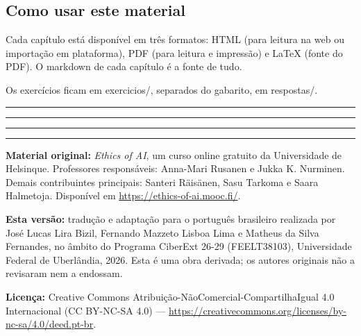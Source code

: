 \documentclass[
  11pt,
]{article}
\newcommand{\faixaEixos}[1][\linewidth]{%
  \noindent
  \textcolor{iaConceitos}{\rule{0.3333#1}{4pt}}%
  \textcolor{iaAplic}{\rule{0.3333#1}{4pt}}%
  \textcolor{iaRiscos}{\rule{0.3333#1}{4pt}}%
  \par}
\renewcommand{\texttt}[1]{{\color{iaAmeixa}\small\ttfamily #1}}
\newenvironment{licenca}
  {\par\vspace{2em}\faixaEixos\par\vspace{0.8em}
   \begingroup\sffamily\scriptsize\color{iaTintaFraca}}
  {\endgroup\par}
\begin{document}
\hypertarget{como-usar-este-material}{%
\subsection{Como usar este material}\label{como-usar-este-material}}

Cada capítulo está disponível em três formatos: HTML (para leitura na
web ou importação em plataforma), PDF (para leitura e impressão) e LaTeX
(fonte do PDF). O markdown de cada capítulo é a fonte de tudo.

Os exercícios ficam em \texttt{exercicios/}, separados do gabarito, em
\texttt{respostas/}.

\begin{center}\rule{0.5\linewidth}{0.5pt}\end{center}

\begin{licenca}

\textbf{Material original:} \emph{Ethics of AI}, um curso online
gratuito da Universidade de Helsinque. Professores responsáveis:
Anna-Mari Rusanen e Jukka K. Nurminen. Demais contribuintes principais:
Santeri Räisänen, Sasu Tarkoma e Saara Halmetoja. Disponível em
\url{https://ethics-of-ai.mooc.fi/}.

\textbf{Esta versão:} tradução e adaptação para o português brasileiro
realizada por José Lucas Lira Bizil, Fernando Mazzeto Lisboa Lima e
Matheus da Silva Fernandes, no âmbito do Programa CiberExt 26-29
(FEELT38103), Universidade Federal de Uberlândia, 2026. Esta é uma obra
derivada; os autores originais não a revisaram nem a endossam.

\textbf{Licença:} Creative Commons
Atribuição-NãoComercial-CompartilhaIgual 4.0 Internacional (CC BY-NC-SA
4.0) ---
\url{https://creativecommons.org/licenses/by-nc-sa/4.0/deed.pt-br}.

\end{licenca}
\end{document}
